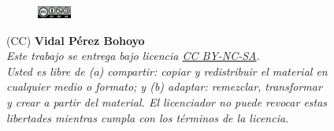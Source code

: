 
\vspace{5cm}

\begin{flushright}

\begin{figure}
\includegraphics[width=0.10\textwidth,right]{figs/by-nc-sa.png}
\end{figure}

\vspace{0.2cm}

{\tiny 
(CC) \textbf{Vidal Pérez Bohoyo}\\ %
\vspace{0.5cm}
\emph{
Este trabajo se entrega bajo licencia \href{https://creativecommons.org/licenses/by-nc-sa/3.0/es/}{CC BY-NC-SA}. \\
Usted es libre de \textit{(a) compartir}: copiar y redistribuir el material en \\
cualquier medio o formato; y \textit{(b) adaptar}: remezclar, transformar \\
y crear a partir del material. El licenciador no puede revocar estas \\
libertades mientras cumpla con los términos de la licencia. \\}
}

\end{flushright}

